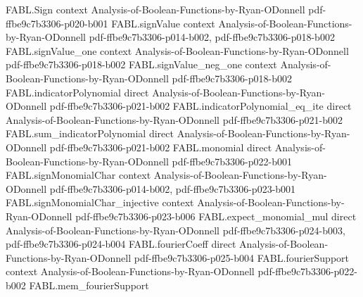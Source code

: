 \begin{theorem}
\label{FABL.noiseStability_eq_rho_iff_signed_dictator}
\leanok
{}
\proofstep
  {FABL.Sign}
  {context}
  {Analysis-of-Boolean-Functions-by-Ryan-ODonnell}
  {pdf-ffbe9c7b3306-p020-b001}
\proofstep
  {FABL.signValue}
  {context}
  {Analysis-of-Boolean-Functions-by-Ryan-ODonnell}
  {pdf-ffbe9c7b3306-p014-b002,
    pdf-ffbe9c7b3306-p018-b002}
\proofstep
  {FABL.signValue_one}
  {context}
  {Analysis-of-Boolean-Functions-by-Ryan-ODonnell}
  {pdf-ffbe9c7b3306-p018-b002}
\proofstep
  {FABL.signValue_neg_one}
  {context}
  {Analysis-of-Boolean-Functions-by-Ryan-ODonnell}
  {pdf-ffbe9c7b3306-p018-b002}
\proofstep
  {FABL.indicatorPolynomial}
  {direct}
  {Analysis-of-Boolean-Functions-by-Ryan-ODonnell}
  {pdf-ffbe9c7b3306-p021-b002}
\proofstep
  {FABL.indicatorPolynomial_eq_ite}
  {direct}
  {Analysis-of-Boolean-Functions-by-Ryan-ODonnell}
  {pdf-ffbe9c7b3306-p021-b002}
\proofstep
  {FABL.sum_indicatorPolynomial}
  {direct}
  {Analysis-of-Boolean-Functions-by-Ryan-ODonnell}
  {pdf-ffbe9c7b3306-p021-b002}
\proofstep
  {FABL.monomial}
  {direct}
  {Analysis-of-Boolean-Functions-by-Ryan-ODonnell}
  {pdf-ffbe9c7b3306-p022-b001}
\proofstep
  {FABL.signMonomialChar}
  {context}
  {Analysis-of-Boolean-Functions-by-Ryan-ODonnell}
  {pdf-ffbe9c7b3306-p014-b002,
    pdf-ffbe9c7b3306-p023-b001}
\proofstep
  {FABL.signMonomialChar_injective}
  {context}
  {Analysis-of-Boolean-Functions-by-Ryan-ODonnell}
  {pdf-ffbe9c7b3306-p023-b006}
\proofstep
  {FABL.expect_monomial_mul}
  {direct}
  {Analysis-of-Boolean-Functions-by-Ryan-ODonnell}
  {pdf-ffbe9c7b3306-p024-b003,
    pdf-ffbe9c7b3306-p024-b004}
\proofstep
  {FABL.fourierCoeff}
  {direct}
  {Analysis-of-Boolean-Functions-by-Ryan-ODonnell}
  {pdf-ffbe9c7b3306-p025-b004}
\proofstep
  {FABL.fourierSupport}
  {context}
  {Analysis-of-Boolean-Functions-by-Ryan-ODonnell}
  {pdf-ffbe9c7b3306-p022-b002}
\proofstep
  {FABL.mem_fourierSupport}

\end{theorem}
